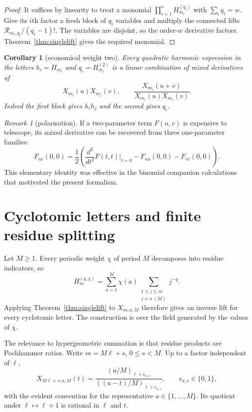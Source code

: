\documentclass[11pt]{article}
\newtheorem{corollary}[theorem]{Corollary}
\theoremstyle{definition}
\theoremstyle{remark}
\newtheorem{remark}[theorem]{Remark}
\begin{document}
\begin{proof}
It suffices by linearity to treat a monomial
$\prod_{i=1}^s H_{m_i}^{(q_i)}$ with $\sum_iq_i=w$.  Give its $i$th factor a fresh block
of $q_i$ variables and multiply the connected lifts
$\mathcal R_{m_i,q_i}/(q_i-1)!$.  The variables are disjoint, so the order-$w$ derivative
factors.  Theorem~\ref{thm:singlelift} gives the required monomial.
\end{proof}

\begin{corollary}[economical weight two]\label{cor:weighttwo}
Every quadratic harmonic expression in the letters $h_i=H_{m_i}$ and
$q_i=H_{m_i}^{(2)}$ is a linear combination of mixed derivatives of
\begin{equation}\label{eq:weight2blocks}
 X_{m_i}(u)X_{m_j}(v),\qquad
 \frac{X_{m_i}(u+v)}{X_{m_i}(u)X_{m_i}(v)}.
\end{equation}
Indeed the first block gives $h_ih_j$ and the second gives $q_i$.
\end{corollary}

\begin{remark}[polarisation]
If a two-parameter term $F(u,v)$ is expensive to telescope, its mixed derivative can be
recovered from three one-parameter families:
\begin{equation}\label{eq:polarization}
 F_{uv}(0,0)=\frac12\left(\frac{d^2}{dt^2}F(t,t)\big|_{t=0}
 -F_{uu}(0,0)-F_{vv}(0,0)\right).
\end{equation}
This elementary identity was effective in the binomial companion calculations that
motivated the present formalism.
\end{remark}

\section{Cyclotomic letters and finite residue splitting}

Let $M\ge1$.  Every periodic weight $\chi$ of period $M$ decomposes into residue
indicators, so
\begin{equation}\label{eq:resdecomp}
 H_m^{(q,\chi)}=
 \sum_{a=1}^M\chi(a)
 \sum_{\substack{1\le j\le m\\j\equiv a\ (M)}}j^{-q}.
\end{equation}
Applying Theorem~\ref{thm:singlelift} to $X_{m;a,M}$ therefore gives an inverse lift for
every cyclotomic letter.  The construction is over the field generated by the values of
$\chi$.

The relevance to hypergeometric summation is that residue products are Pochhammer ratios.
Write $m=M\ell+s$, $0\le s<M$.  Up to a factor independent of $\ell$,
\begin{equation}\label{eq:respoch}
 X_{M\ell+s;a,M}(t)
 =\frac{(a/M)_{\ell+\epsilon_{a,s}}}
 {((a-t)/M)_{\ell+\epsilon_{a,s}}},
 \qquad \epsilon_{a,s}\in\{0,1\},
\end{equation}
with the evident convention for the representative $a\in\{1,\ldots,M\}$.  Its quotient
under $\ell\mapsto\ell+1$ is rational in $\ell$ and $t$.
\end{document}
